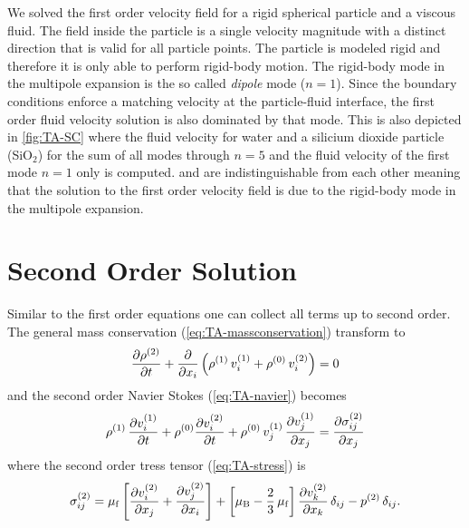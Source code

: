 We solved the first order velocity field for a rigid spherical particle and a 
viscous fluid. The field inside the particle is a single velocity magnitude 
with a distinct direction that is valid for all particle points. The particle 
is modeled rigid and therefore it is only able to perform rigid-body motion. 
The rigid-body mode in the multipole expansion is the so called \emph{dipole} 
mode ($n=1$). Since the boundary conditions enforce a matching velocity at the 
particle-fluid interface, the first order fluid velocity solution is also 
dominated by that mode. This is also depicted in \cref{fig:TA-SC} where the 
fluid velocity for water and a silicium dioxide particle (SiO$_{2}$) for the 
sum of all modes through $n=5$ and the fluid velocity of the first mode $n=1$ 
only is computed.  and  are 
indistinguishable from each other meaning that the solution to the first order 
velocity field is due to the rigid-body mode in the multipole expansion.

\section{Second Order Solution\label{sec:TA-secondorder}}

Similar to the first order equations one can collect all terms up to second 
order. The general mass conservation (\cref{eq:TA-massconservation}) transform 
to
\begin{equation}
  \pdv{  \rho^{(2)}  }{t} + \pdv{x_{i}}\left(\rho^{(1)}\,v_{i}^{(1)} 
  + \rho^{(0)}\,v_{i}^{(2)} \right) = 0
  \label{eq:TA-nd-massconservatio}
\end{equation}
and the second order Navier Stokes (\cref{eq:TA-navier}) becomes
\begin{equation}
  \rho^{(1)}\,\pdv{  v_{i}^{(1)}  }{t} + \rho^{(0)} 
  \pdv{  v_{i}^{(2)}  }{t} + 
  \rho^{(0)}\,v_{j}^{(1)}\,\pdv{  v_{j}^{(1)}  }{x_{j}} = 
  \pdv{  \sigma_{ij}^{(2)}  }{x_{j}}
  \label{eq:TA-nd-navier}
\end{equation}
where the second order tress tensor (\cref{eq:TA-stress}) is
\begin{equation}
  \sigma_{ij}^{(2)} = \mu_{\mathrm{f}}\left[ \pdv{  v_{i}^{(2)}  }{x_{j}} + 
  \pdv{  v_{j}^{(2)}  }{x_{i}} \right] + \left[ \mu_{\mathrm{B}} - 
  \frac{2}{3}\,\mu_{\mathrm{f}} \right] \pdv{  v_{k}^{(2)}  }{x_{k}} \,\delta_{ij} - 
  p^{(2)}\,\delta_{ij}.
  \label{eq:TA-nd-stress}
\end{equation}

